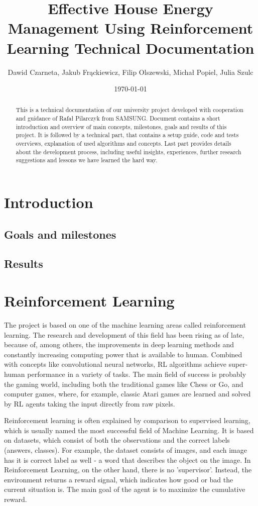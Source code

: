 \documentclass{article}
\title{Effective House Energy Management Using Reinforcement Learning Technical Documentation} %
\author{Dawid Czarneta, Jakub Frąckiewicz, Filip Olszewski, Michał Popiel, Julia Szulc}
\date{\today}
\begin{document}
\maketitle %

\begin{abstract}
This is a technical documentation of our university project developed with cooperation and guidance of Rafał Pilarczyk from SAMSUNG. Document contains a short introduction and overview of main concepts, milestones, goals and results of this project. It is followed by a technical part, that contains a setup guide, code and tests overviews, explanation of used algorithms and concepts. Last part provides details about the development process, including useful insights, experiences, further research suggestions and lessons we have learned the hard way.
\end{abstract}

\section{Introduction}
\subsection{Goals and milestones}
\subsection{Results}

\section{Reinforcement Learning}
The project is based on one of the machine learning areas called reinforcement learning. The research and development of this field has been rising as of late, because of, among others, the improvements in deep learning methods and constantly increasing computing power that is available to human. Combined with concepts like convolutional neural networks, RL algorithms achieve super-human performance in a variety of tasks. The main field of success is probably the gaming world, including both the traditional games like Chess or Go, and computer games, where, for example, classic Atari games are learned and solved by RL agents taking the input directly from raw pixels.

Reinforcement learning is often explained by comparison to supervised learning, which is usually named the most successful field of Machine Learning. It is based on datasets, which consist of both the observations and the correct labels (answers, classes). For example, the dataset consists of images, and each image has it is correct label as well - a word that describes the object on the image. In Reinforcement Learning, on the other hand, there is no 'supervisor'. Instead, the environment returns a reward signal, which indicates how good or bad the current situation is. The main goal of the agent is to maximize the cumulative reward.
\end{document}
